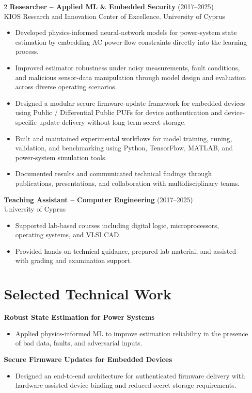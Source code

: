 \documentclass[10pt,a4paper]{article}
\begin{document}
\begin{multicols}{2}
\textbf{Researcher -- Applied ML \& Embedded Security} (2017--2025)\\
KIOS Research and Innovation Center of Excellence, University of Cyprus
\begin{itemize}
  \item Developed physics-informed neural-network models for power-system state estimation by embedding AC power-flow constraints directly into the learning process.
  \item Improved estimator robustness under noisy measurements, fault conditions, and malicious sensor-data manipulation through model design and evaluation across diverse operating scenarios.
  \item Designed a modular secure firmware-update framework for embedded devices using Public / Differential Public PUFs for device authentication and device-specific update delivery without long-term secret storage.
  \item Built and maintained experimental workflows for model training, tuning, validation, and benchmarking using Python, TensorFlow, MATLAB, and power-system simulation tools.
  \item Documented results and communicated technical findings through publications, presentations, and collaboration with multidisciplinary teams.
\end{itemize}

\textbf{Teaching Assistant -- Computer Engineering} (2017--2025)\\
University of Cyprus
\begin{itemize}
  \item Supported lab-based courses including digital logic, microprocessors, operating systems, and VLSI CAD.
  \item Provided hands-on technical guidance, prepared lab material, and assisted with grading and examination support.
\end{itemize}

\section*{Selected Technical Work}
\textbf{Robust State Estimation for Power Systems}
\begin{itemize}
  \item Applied physics-informed ML to improve estimation reliability in the presence of bad data, faults, and adversarial inputs.
\end{itemize}

\textbf{Secure Firmware Updates for Embedded Devices}
\begin{itemize}
  \item Designed an end-to-end architecture for authenticated firmware delivery with hardware-assisted device binding and reduced secret-storage requirements.
\end{itemize}


\end{multicols}
\end{document}
